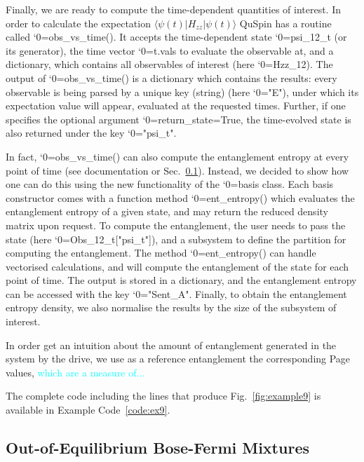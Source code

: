 \documentclass{SciPost}
\newcommand\0{\scalebox{-1}[1]{0}}
\let\svttfamily\ttfamily
\renewcommand\ttfamily{\svttfamily\catcode`0=\active }
\renewcommand\texttt{\bgroup\ttfamily\texttthelp}
\def\texttthelp#1{#1\egroup}
\newcommand*{\cyan}{\textcolor{cyan}}
\newcommand{\Spincode}{example9.py}
\begin{document}

Finally, we are ready to compute the time-dependent quantities of interest. In order to calculate the expectation $\langle\psi(t)|H_{zz}|\psi(t)\rangle$ QuSpin has a routine called \texttt{obs\_vs\_time()}. It accepts the time-dependent state \texttt{psi\_12\_t} (or its generator), the time vector \texttt{t.vals} to evaluate the observable at, and a dictionary, which contains all observables of interest (here \texttt{Hzz\_12}). The output of \texttt{obs\_vs\_time()} is a dictionary which contains the results: every observable is being parsed by a unique key (string) (here \texttt{"E"}), under which its expectation value will appear, evaluated at the requested times. Further, if one specifies the optional argument \texttt{return\_state=True}, the time-evolved state is also returned under the key \texttt{"psi\_t"}. 

In fact, \texttt{obs\_vs\_time()} can also compute the entanglement entropy at every point of time (see documentation or Sec.~\ref{subsec:BF_mixtures}). Instead, we decided to show how one can do this using the new functionality of the \texttt{basis} class. Each basis constructor comes with a function method \texttt{ent\_entropy()} which evaluates the entanglement entropy of a given state, and may return the reduced density matrix upon request. To compute the entanglement, the user needs to pass the state (here \texttt{Obs\_12\_t["psi\_t"]}), and a subsystem to define the partition for computing the entanglement. The method \texttt{ent\_entropy()} can handle vectorised calculations, and will compute the entanglement of the state for each point of time. The output is stored in a dictionary, and the entanglement entropy can be accessed with the key \texttt{"Sent\_A"}. Finally, to obtain the entanglement entropy density, we also normalise the results by the size of the subsystem of interest.

In order get an intuition about the amount of entanglement generated in the system by the drive, we use as a reference entanglement the corresponding Page values, \cyan{which are a measure of...}


The complete code including the lines that produce Fig.~\ref{fig:example9} is available in Example Code~\ref{code:ex9}.




\subsection{Out-of-Equilibrium Bose-Fermi Mixtures}
\label{subsec:BF_mixtures}
\end{document}
